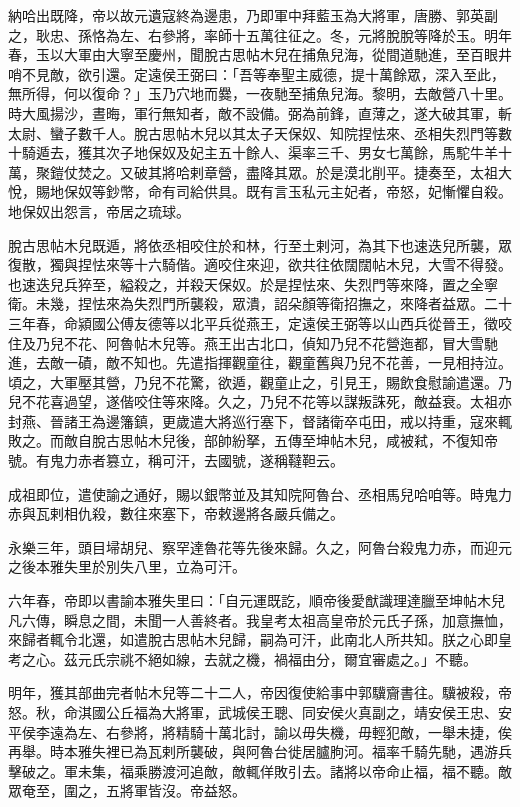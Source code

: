\begin{pinyinscope}
納哈出既降，帝以故元遺寇終為邊患，乃即軍中拜藍玉為大將軍，唐勝、郭英副之，耿忠、孫恪為左、右參將，率師十五萬往征之。冬，元將脫脫等降於玉。明年春，玉以大軍由大寧至慶州，聞脫古思帖木兒在捕魚兒海，從間道馳進，至百眼井哨不見敵，欲引還。定遠侯王弼曰：「吾等奉聖主威德，提十萬餘眾，深入至此，無所得，何以復命？」玉乃穴地而爨，一夜馳至捕魚兒海。黎明，去敵營八十里。時大風揚沙，晝晦，軍行無知者，敵不設備。弼為前鋒，直薄之，遂大破其軍，斬太尉、蠻子數千人。脫古思帖木兒以其太子天保奴、知院捏怯來、丞相失烈門等數十騎遁去，獲其次子地保奴及妃主五十餘人、渠率三千、男女七萬餘，馬駝牛羊十萬，聚鎧仗焚之。又破其將哈剌章營，盡降其眾。於是漠北削平。捷奏至，太祖大悅，賜地保奴等鈔幣，命有司給供具。既有言玉私元主妃者，帝怒，妃慚懼自殺。地保奴出怨言，帝居之琉球。

脫古思帖木兒既遁，將依丞相咬住於和林，行至土剌河，為其下也速迭兒所襲，眾復散，獨與捏怯來等十六騎偕。適咬住來迎，欲共往依闊闊帖木兒，大雪不得發。也速迭兒兵猝至，縊殺之，并殺天保奴。於是捏怯來、失烈門等來降，置之全寧衛。未幾，捏怯來為失烈門所襲殺，眾潰，詔朵顏等衛招撫之，來降者益眾。二十三年春，命潁國公傅友德等以北平兵從燕王，定遠侯王弼等以山西兵從晉王，徵咬住及乃兒不花、阿魯帖木兒等。燕王出古北口，偵知乃兒不花營迤都，冒大雪馳進，去敵一磧，敵不知也。先遣指揮觀童往，觀童舊與乃兒不花善，一見相持泣。頃之，大軍壓其營，乃兒不花驚，欲遁，觀童止之，引見王，賜飲食慰諭遣還。乃兒不花喜過望，遂偕咬住等來降。久之，乃兒不花等以謀叛誅死，敵益衰。太祖亦封燕、晉諸王為邊籓鎮，更歲遣大將巡行塞下，督諸衛卒屯田，戒以持重，寇來輒敗之。而敵自脫古思帖木兒後，部帥紛拏，五傳至坤帖木兒，咸被弒，不復知帝號。有鬼力赤者篡立，稱可汗，去國號，遂稱韃靼云。

成祖即位，遣使諭之通好，賜以銀幣並及其知院阿魯台、丞相馬兒哈咱等。時鬼力赤與瓦剌相仇殺，數往來塞下，帝敕邊將各嚴兵備之。

永樂三年，頭目埽胡兒、察罕達魯花等先後來歸。久之，阿魯台殺鬼力赤，而迎元之後本雅失里於別失八里，立為可汗。

六年春，帝即以書諭本雅失里曰：「自元運既訖，順帝後愛猷識理達臘至坤帖木兒凡六傳，瞬息之間，未聞一人善終者。我皇考太祖高皇帝於元氏子孫，加意撫恤，來歸者輒令北還，如遣脫古思帖木兒歸，嗣為可汗，此南北人所共知。朕之心即皇考之心。茲元氏宗祧不絕如線，去就之機，禍福由分，爾宜審處之。」不聽。

明年，獲其部曲完者帖木兒等二十二人，帝因復使給事中郭驥齎書往。驥被殺，帝怒。秋，命淇國公丘福為大將軍，武城侯王聰、同安侯火真副之，靖安侯王忠、安平侯李遠為左、右參將，將精騎十萬北討，諭以毋失機，毋輕犯敵，一舉未捷，俟再舉。時本雅失裡已為瓦剌所襲破，與阿魯台徙居臚朐河。福率千騎先馳，遇游兵擊破之。軍未集，福乘勝渡河追敵，敵輒佯敗引去。諸將以帝命止福，福不聽。敵眾奄至，圍之，五將軍皆沒。帝益怒。


\end{pinyinscope}
